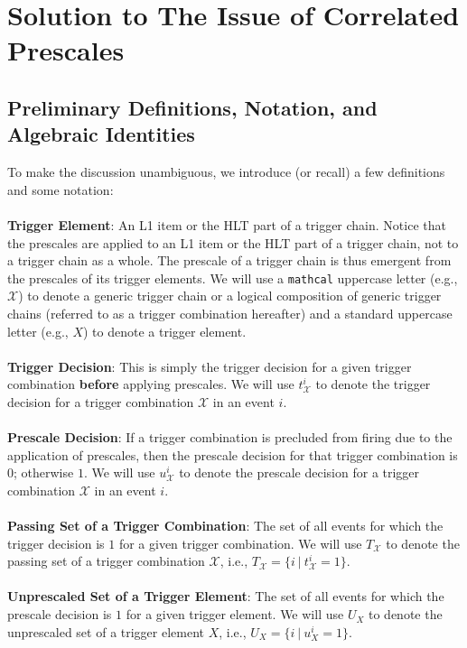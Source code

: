 \section{Solution to The Issue of Correlated Prescales}
\label{sec:app-prw-math}
\subsection{Preliminary Definitions, Notation, and Algebraic Identities}
To make the discussion unambiguous, we introduce (or recall) a few definitions and some notation:\\\\
\textbf{Trigger Element}: An L1 item or the HLT part of a trigger chain. Notice that the prescales are applied to an L1 item or the HLT part of a trigger chain, not to a trigger chain as a whole. The prescale of a trigger chain is thus emergent from the prescales of its trigger elements. %
We will use a \texttt{mathcal} uppercase letter (e.g., $\mathcal{X}$) to denote a generic trigger chain or a logical composition of generic trigger chains (referred to as a trigger combination hereafter) and a standard uppercase letter (e.g., $X$) to denote a trigger element. %
\\\\
\textbf{Trigger Decision}: This is simply the trigger decision for a given trigger combination \textbf{before} applying prescales. We will use $t^i_\mathcal{X}$ to denote the trigger decision for a trigger combination $\mathcal{X}$ in an event $i$.\\\\
\textbf{Prescale Decision}: If a trigger combination is precluded from firing due to the application of prescales, then the prescale decision for that trigger combination is $0$; otherwise $1$. We will use $u_\mathcal{X}^i$ to denote the prescale decision for a trigger combination $\mathcal{X}$ in an event $i$.
\\\\
\textbf{Passing Set of a Trigger Combination}: The set of all events for which the trigger decision is $1$ for a given trigger combination. We will use $T_\mathcal{X}$ to denote the passing set of a trigger combination $\mathcal{X}$, i.e., $T_{\mathcal{X}}=\{i\ \vert\ t^i_\mathcal{X}=1\}$. \\\\
\textbf{Unprescaled Set of a Trigger Element}: The set of all events for which the prescale decision is $1$ for a given trigger element. We will use $U_X$ to denote the unprescaled set of a trigger element $X$, i.e., $U_X=\{i\ \vert \ u^i_X=1\}$.
